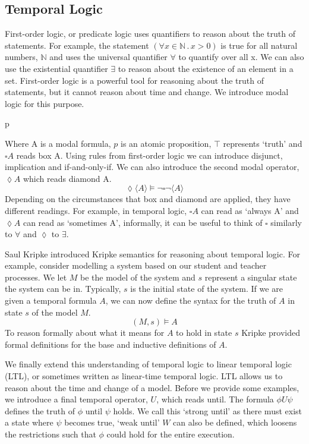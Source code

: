 \subsection{Temporal Logic}
First-order logic, or predicate logic uses quantifiers to reason about the truth of statements. For example, the statement $(\forall x \in \mathbb{N} \,.\, x > 0)$ is true for all natural numbers, $\mathbb{N}$ and uses the universal quantifier $\forall$ to quantify over all x. We can also use the existential quantifier $\exists$ to reason about the existence of an element in a set. First-order logic is a powerful tool for reasoning about the truth of statements, but it cannot reason about time and change. We introduce modal logic for this purpose.
\begin{bnf*}
      {p \bnfor \top \bnfor \neg {} \bnfor {} \land {} \bnfor \square {}}\\
\end{bnf*}
Where A is a modal formula, $p$ is an atomic proposition, $\top$ represents `truth' and $\square A$ reads box A. Using rules from first-order logic we can introduce disjunct, implication and if-and-only-if. We can also introduce the second modal operator, $\lozenge A$ which reads diamond A.
\[
\lozenge \langle A \rangle \models \neg \square \neg \langle A \rangle
\]
Depending on the circumstances that box and diamond are applied, they have different readings. For example, in temporal logic, $\square A$ can read as `always A' and $\lozenge A$ can read as `sometimes A', informally, it can be useful to think of $\square$ similarly to $\forall$ and $\lozenge$ to $\exists$.
\par
Saul Kripke introduced Kripke semantics \cite{kripke} for reasoning about temporal logic. For example, consider modelling a system based on our student and teacher processes. We let $M$ be the model of the system and $s$ represent a singular state the system can be in. Typically, $s$ is the initial state of the system. If we are given a temporal formula $A$, we can now define the syntax for the truth of $A$ in state $s$ of the model $M$.
\[
(M, s) \models A
\]
To reason formally about what it means for $A$ to hold in state $s$ Kripke provided formal definitions for the base and inductive definitions of $A$.
\par
We finally extend this understanding of temporal logic to linear temporal logic (LTL), or sometimes written as linear-time temporal logic. LTL allows us to reason about the time and change of a model. Before we provide some examples, we introduce a final temporal operator, $U$, which reads until. The formula $\phi U \psi$ defines the truth of $\phi$ until $\psi$ holds. We call this `strong until' as there must exist a state where $\psi$ becomes true, `weak until' $W$ can also be defined, which loosens the restrictions such that $\phi$ could hold for the entire execution.

